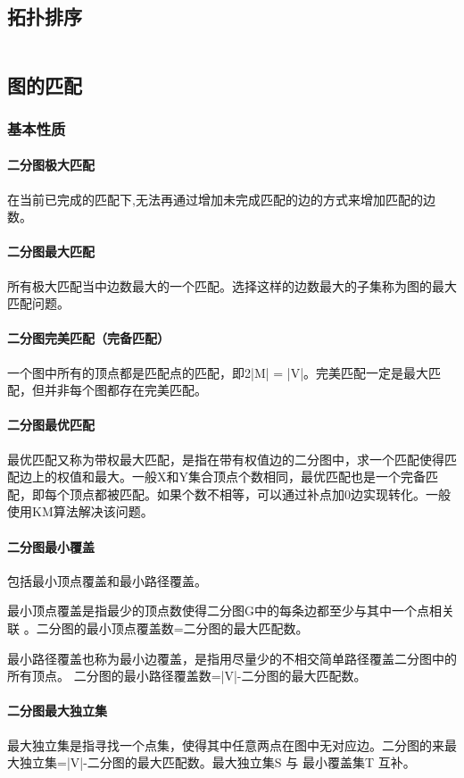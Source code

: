\documentclass[a4paper,11pt]{article}
\begin{document}
\subsection{拓扑排序}
\inputminted[linenos]{c++}{graph/toposort.cpp}
\subsection{图的匹配}
\subsubsection{基本性质}
\paragraph{二分图极大匹配}
在当前已完成的匹配下,无法再通过增加未完成匹配的边的方式来增加匹配的边数。
\paragraph{二分图最大匹配} 
所有极大匹配当中边数最大的一个匹配。选择这样的边数最大的子集称为图的最大匹配问题。
\paragraph{二分图完美匹配（完备匹配）}
一个图中所有的顶点都是匹配点的匹配，即2|M| = |V|。完美匹配一定是最大匹配，但并非每个图都存在完美匹配。
\paragraph{二分图最优匹配}
最优匹配又称为带权最大匹配，是指在带有权值边的二分图中，求一个匹配使得匹配边上的权值和最大。一般X和Y集合顶点个数相同，最优匹配也是一个完备匹配，即每个顶点都被匹配。如果个数不相等，可以通过补点加0边实现转化。一般使用KM算法解决该问题。
\paragraph{二分图最小覆盖}
包括最小顶点覆盖和最小路径覆盖。

最小顶点覆盖是指最少的顶点数使得二分图G中的每条边都至少与其中一个点相关联 。二分图的最小顶点覆盖数=二分图的最大匹配数。

最小路径覆盖也称为最小边覆盖，是指用尽量少的不相交简单路径覆盖二分图中的所有顶点。 二分图的最小路径覆盖数=|V|-二分图的最大匹配数。

\paragraph{二分图最大独立集}
最大独立集是指寻找一个点集，使得其中任意两点在图中无对应边。二分图的来最大独立集=|V|-二分图的最大匹配数。最大独立集S 与 最小覆盖集T 互补。
\end{document}

